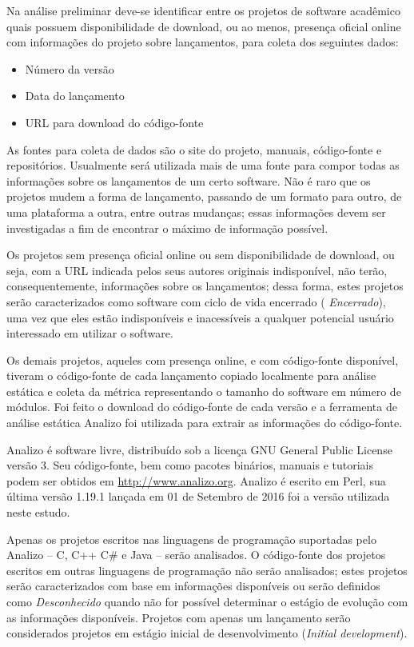 Na análise preliminar deve-se identificar entre os projetos de software
acadêmico quais possuem disponibilidade de download, ou ao menos, presença
oficial online com informações do projeto sobre lançamentos, para coleta
dos seguintes dados:

\begin{itemize}
  \item Número da versão
  \item Data do lançamento
  \item URL para download do código-fonte
\end{itemize}

As fontes para coleta de dados são o site do projeto, manuais, código-fonte e
repositórios. Usualmente será utilizada mais de uma fonte para compor todas as
informações sobre os lançamentos de um certo software. Não é raro que os
projetos mudem a forma de lançamento, passando de um formato para outro, de uma
plataforma a outra, entre outras mudanças; essas informações devem ser
investigadas a fim de encontrar o máximo de informação possível.

Os projetos sem presença oficial online ou sem disponibilidade de download, ou
seja, com a URL indicada pelos seus autores originais indisponível,
não terão, consequentemente, informações sobre os lançamentos; dessa forma, estes
projetos serão caracterizados como software com ciclo de vida encerrado ({\it
Encerrado}), uma vez que eles estão indisponíveis e inacessíveis a qualquer
potencial usuário interessado em utilizar o software.

Os demais projetos, aqueles com presença online, e com código-fonte disponível,
tiveram o código-fonte de cada lançamento copiado localmente para análise
estática e coleta da métrica representando o tamanho do software em número de
módulos. Foi feito o download do código-fonte de cada versão e a ferramenta de
análise estática Analizo foi utilizada para extrair as informações do código-fonte.

Analizo é software livre, distribuído sob a licença GNU General Public License
versão 3. Seu código-fonte, bem como pacotes binários, manuais e tutoriais
podem ser obtidos em \url{http://www.analizo.org}. Analizo é escrito em Perl,
sua última versão 1.19.1 lançada em 01 de Setembro de 2016 foi a versão
utilizada neste estudo.

Apenas os projetos escritos nas linguagens de programação suportadas pelo Analizo 
-- C, C++ C\# e Java -- serão analisados.
O código-fonte dos projetos escritos em
outras linguagens de programação não serão analisados; 
estes projetos serão caracterizados com base em informações disponíveis ou 
serão definidos como {\it Desconhecido} quando não for possível determinar 
o estágio de evolução com as informações disponíveis. Projetos com apenas um
lançamento serão considerados projetos em estágio inicial de desenvolvimento
({\it Initial development}).

